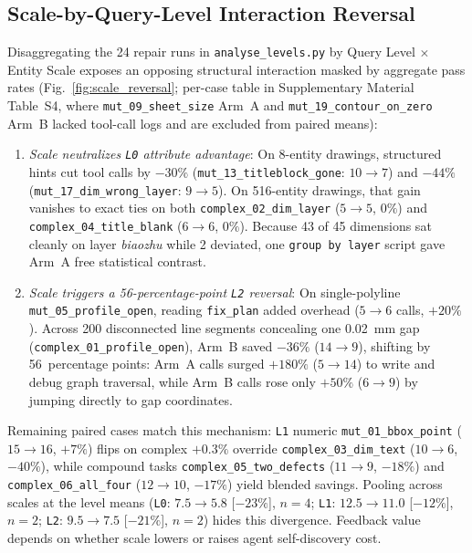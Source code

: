 \documentclass[nocopyright,nolists,upint,varvw,hyphenate]{asmejour}
\begin{document}
\subsection{Scale-by-Query-Level Interaction Reversal}\label{sec:scale_level_reversal}

Disaggregating the 24 repair runs in \texttt{analyse\_levels.py} by Query Level $\times$ Entity Scale exposes an opposing structural interaction masked by aggregate pass rates (Fig.~\ref{fig:scale_reversal}; per-case table in Supplementary Material Table~S4, where \texttt{mut\_09\_sheet\_size} Arm~A and \texttt{mut\_19\_contour\_on\_zero} Arm~B lacked tool-call logs and are excluded from paired means):

\begin{enumerate}
\item \emph{Scale neutralizes {\upshape\texttt{L0}} attribute advantage}: On 8-entity drawings, structured hints cut tool calls by $-30\%$ (\texttt{mut\_13\_titleblock\_gone}: $10 \to 7$) and $-44\%$ (\texttt{mut\_17\_dim\_wrong\_layer}: $9 \to 5$). On 516-entity drawings, that gain vanishes to exact ties on both \texttt{complex\_02\_dim\_layer} ($5 \to 5$, $0\%$) and \texttt{complex\_04\_title\_blank} ($6 \to 6$, $0\%$). Because 43 of 45 dimensions sat cleanly on layer \emph{biaozhu} while 2 deviated, one \texttt{group by layer} script gave Arm~A free statistical contrast.
\item \emph{Scale triggers a 56-percentage-point {\upshape\texttt{L2}} reversal}: On single-polyline \texttt{mut\_05\_profile\_open}, reading \texttt{fix\_plan} added overhead ($5 \to 6$ calls, $+20\%$). Across 200 disconnected line segments concealing one 0.02~mm gap (\texttt{complex\_01\_profile\_open}), Arm~B saved $-36\%$ ($14 \to 9$), shifting by 56~percentage points: Arm~A calls surged $+180\%$ ($5 \to 14$) to write and debug graph traversal, while Arm~B calls rose only $+50\%$ ($6 \to 9$) by jumping directly to gap coordinates.
\end{enumerate}

Remaining paired cases match this mechanism: \texttt{L1} numeric \texttt{mut\_01\_bbox\_point} ($15 \to 16$, $+7\%$) flips on complex $+0.3\%$ override \texttt{complex\_03\_dim\_text} ($10 \to 6$, $-40\%$), while compound tasks \texttt{complex\_05\_two\_defects} ($11 \to 9$, $-18\%$) and \texttt{complex\_06\_all\_four} ($12 \to 10$, $-17\%$) yield blended savings. Pooling across scales at the level means (\texttt{L0}: $7.5 \to 5.8$ [$-23\%$], $n=4$; \texttt{L1}: $12.5 \to 11.0$ [$-12\%$], $n=2$; \texttt{L2}: $9.5 \to 7.5$ [$-21\%$], $n=2$) hides this divergence. Feedback value depends on whether scale lowers or raises agent self-discovery cost.
\end{document}
